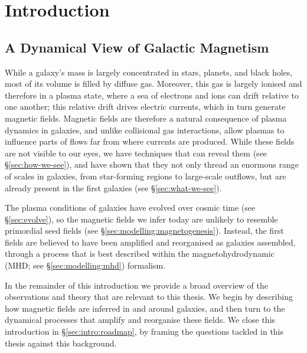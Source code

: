 \chapter{Introduction}

\noindent\hfill\parbox{0.85\textwidth}{\raggedleft
{}
}\par

\vspace{1.5 cm}

\section{A Dynamical View of Galactic Magnetism}

While a galaxy's mass is largely concentrated in stars, planets, and black holes, most of its volume is filled by diffuse gas. Moreover, this gas is largely ionised and therefore in a plasma state, where a sea of electrons and ions can drift relative to one another; this relative drift drives electric currents, which in turn generate magnetic fields. Magnetic fields are therefore a natural consequence of plasma dynamics in galaxies, and unlike collisional gas interactions, allow plasmas to influence parts of flows far from where currents are produced. While these fields are not visible to our eyes, we have techniques that can reveal them (see \S\ref{sec:how-we-see}), and have shown that they not only thread an enormous range of scales in galaxies, from star-forming regions to large-scale outflows, but are already present in the first galaxies (see \S\ref{sec:what-we-see}).

The plasma conditions of galaxies have evolved over cosmic time (see \S\ref{sec:evolve}), so the magnetic fields we infer today are unlikely to resemble primordial seed fields (see \S\ref{sec:modelling:magnetogenesis}). Instead, the first fields are believed to have been amplified and reorganised as galaxies assembled, through a process that is best described within the magnetohydrodynamic (MHD; see \S\ref{sec:modelling:mhd}) formalism.

In the remainder of this introduction we provide a broad overview of the observations and theory that are relevant to this thesis. We begin by describing how magnetic fields are inferred in and around galaxies, and then turn to the dynamical processes that amplify and reorganise these fields. We close this introduction in \S\ref{sec:intro:roadmap}, by framing the questions tackled in this thesis against this background.

